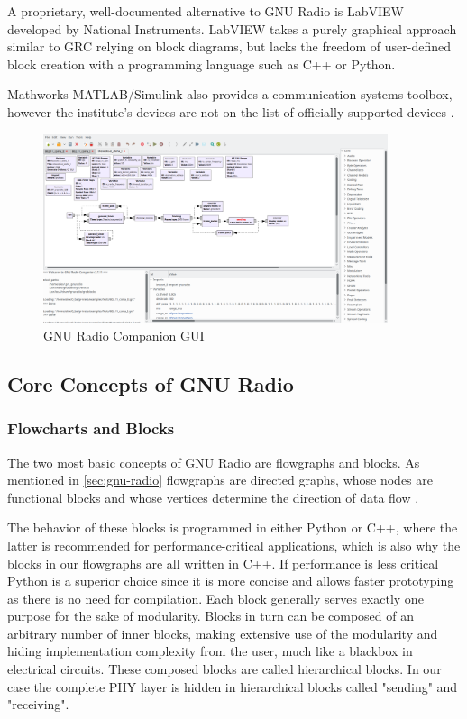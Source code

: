 A proprietary, well-documented alternative to GNU Radio is LabVIEW developed by National Instruments. LabVIEW takes a purely graphical approach similar to GRC relying on block diagrams, but lacks the freedom of user-defined block creation with a programming language such as C++ or Python.

Mathworks MATLAB/Simulink also provides a communication systems toolbox, however the institute's devices are not on the list of officially supported devices \cite{Matlab}.

\begin{figure}[t]
	\label{fig:gnuradio}
	\begin{center}
		\includegraphics[width=0.9\textwidth,valign=c]{pictures/grc_ui}
	\end{center}
	\caption{GNU Radio Companion GUI}
\end{figure}

\subsection{Core Concepts of GNU Radio}

\subsubsection{Flowcharts and Blocks}

The two most basic concepts of GNU Radio are flowgraphs and blocks. As mentioned in \ref{sec:gnu-radio} flowgraphs are directed graphs, whose nodes are functional blocks and whose vertices determine the direction of data flow \cite{GR1}. 

The behavior of these blocks is programmed in either Python or C++, where the latter is recommended for performance-critical applications, which is also why the blocks in our flowgraphs are all written in C++. If performance is less critical Python is a superior choice since it is more concise and allows faster prototyping as there is no need for compilation. Each block generally serves exactly one purpose for the sake of modularity. Blocks in turn can be composed of an arbitrary number of inner blocks, making extensive use of the modularity and hiding implementation complexity from the user, much like a blackbox in electrical circuits. These composed blocks are called hierarchical blocks. In our case the complete PHY layer is hidden in hierarchical blocks called "sending" and "receiving".


